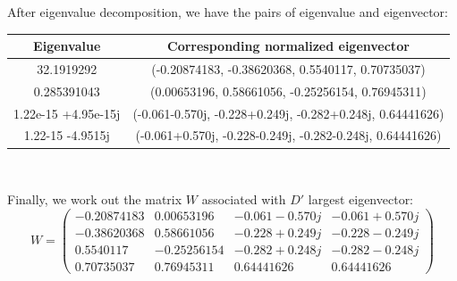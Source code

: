 \documentclass[11pt,a4paper]{article}
\newcommand{\htab}{\hspace*{0.63cm}}
\begin{document}
\htab After eigenvalue decomposition, we have the pairs of eigenvalue and eigenvector: \\
    \begin{center}
    \begin{tabular} {||c | c||} \hline
        Eigenvalue   & Corresponding normalized eigenvector \\ \hline
        32.1919292 &  (-0.20874183, -0.38620368,  0.5540117, 0.70735037)  \\  \hline
        0.285391043 & (0.00653196,  0.58661056, -0.25256154,  0.76945311)  \\ \hline
        1.22e-15 +4.95e-15j & (-0.061-0.570j, -0.228+0.249j, -0.282+0.248j, 0.64441626) \\ \hline
        1.22-15 -4.9515j & (-0.061+0.570j, -0.228-0.249j, -0.282-0.248j, 0.64441626) \\ \hline
    \end{tabular} \\
    \end{center}
\htab Finally, we work out the matrix $W$ associated with $D'$ largest eigenvector: \\
$$ W = \begin{pmatrix}
        -0.20874183 & 0.00653196 & -0.061-0.570j & -0.061+0.570j \\
        -0.38620368 & 0.58661056 & -0.228+0.249j & -0.228-0.249j \\
        0.5540117 & -0.25256154 & -0.282+0.248j & -0.282-0.248j \\
        0.70735037 &  0.76945311 & 0.64441626 & 0.64441626 
   \end{pmatrix} $$
\newpage

\end{document}
